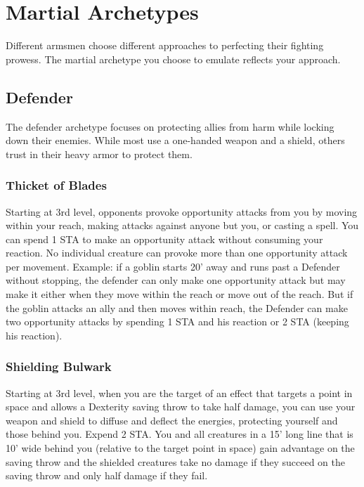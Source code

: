 \section{Martial Archetypes}

Different armsmen choose different approaches to perfecting their fighting prowess. The martial archetype you choose to emulate reflects your approach.

\subsection{Defender}
The defender archetype focuses on protecting allies from harm while locking down their enemies. While most use a one-handed weapon and a shield, others trust in their heavy armor to protect them.

\subsubsection{Thicket of Blades}
Starting at 3rd level, opponents provoke opportunity attacks from you by moving within your reach, making attacks against anyone but you, or casting a spell. You can spend 1 STA to make an opportunity attack without consuming your reaction. No individual creature can provoke more than one opportunity attack per movement. Example: if a goblin starts 20' away and runs past a Defender without stopping, the defender can only make one opportunity attack but may make it either when they move within the reach or move out of the reach. But if the goblin attacks an ally and then moves within reach, the Defender can make two opportunity attacks by spending 1 STA and his reaction or 2 STA (keeping his reaction). 

\subsubsection{Shielding Bulwark}
Starting at 3rd level, when you are the target of an effect that targets a point in space and allows a Dexterity saving throw to take half damage, you can use your weapon and shield to diffuse and deflect the energies, protecting yourself and those behind you. Expend 2 STA. You and all creatures in a 15' long line that is 10' wide behind you (relative to the target point in space) gain advantage on the saving throw and the shielded creatures take no damage if they succeed on the saving throw and only half damage if they fail.

